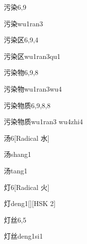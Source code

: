 \begin{entry}{污染}{6,9}
  \begin{phonetics}{污染}{wu1ran3}
  \end{phonetics}
\end{entry}

\begin{entry}{污染区}{6,9,4}
  \begin{phonetics}{污染区}{wu1ran3qu1}
  \end{phonetics}
\end{entry}

\begin{entry}{污染物}{6,9,8}
  \begin{phonetics}{污染物}{wu1ran3wu4}
  \end{phonetics}
\end{entry}

\begin{entry}{污染物质}{6,9,8,8}
  \begin{phonetics}{污染物质}{wu1ran3 wu4zhi4}
  \end{phonetics}
\end{entry}

\begin{entry}{汤}{6}[Radical 水]
  \begin{phonetics}{汤}{shang1}
  \end{phonetics}
  \begin{phonetics}{汤}{tang1}
  \end{phonetics}
\end{entry}

\begin{entry}{灯}{6}[Radical 火]
  \begin{phonetics}{灯}{deng1}[][HSK 2]
  \end{phonetics}
\end{entry}

\begin{entry}{灯丝}{6,5}
  \begin{phonetics}{灯丝}{deng1si1}
  \end{phonetics}
\end{entry}


